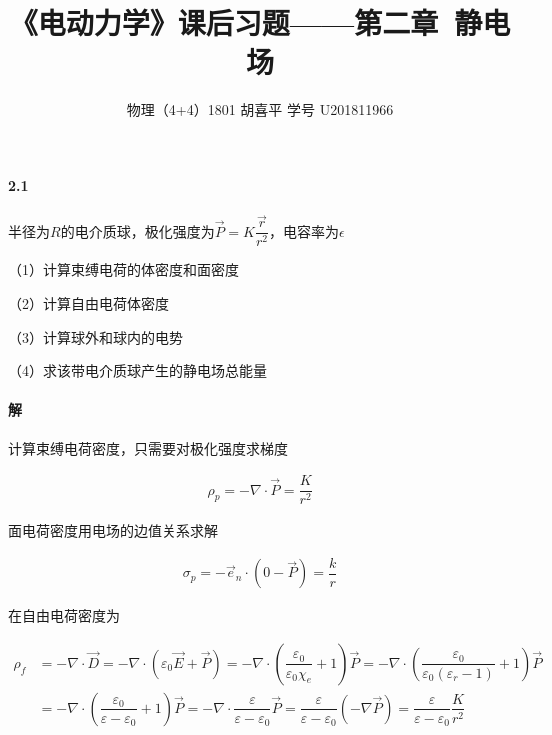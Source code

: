 \documentclass{article}
\author{物理（4+4）1801 \quad 胡喜平 \quad 学号 U201811966}
\affil{网站 https://hxp.plus/ \quad 邮件 hxp201406@gmail.com}
\title{《电动力学》课后习题——第二章\ 静电场}
\begin{document}
\maketitle\thispagestyle{fancy}

\paragraph{2.1}

半径为$R$的电介质球，极化强度为$\vec{P}=K \dfrac{\vec{r}}{r^2} $，电容率为$\epsilon$

（1）计算束缚电荷的体密度和面密度

（2）计算自由电荷体密度

（3）计算球外和球内的电势

（4）求该带电介质球产生的静电场总能量

\paragraph{解}

计算束缚电荷密度，只需要对极化强度求梯度

\begin{equation*}
  \begin{aligned}
    \rho_p = - \nabla \cdot \vec{P} = \dfrac{K}{r^2} 
  \end{aligned}
\end{equation*}

面电荷密度用电场的边值关系求解

\begin{equation*}
  \begin{aligned}
    \sigma_p = - \vec{e}_n \cdot \left( 0 - \vec{P} \right) = \dfrac{k}{r} 
  \end{aligned}
\end{equation*}

在自由电荷密度为

\begin{equation*}
  \begin{aligned}
    \rho_f &= - \nabla \cdot \vec{D} = - \nabla \cdot \left( \varepsilon_0 \vec{E} + \vec{P} \right)
    = - \nabla \cdot \left( \dfrac{\varepsilon_0}{\varepsilon_0 \chi_e} + 1   \right) \vec{P}
    = - \nabla \cdot \left( \dfrac{\varepsilon_0}{\varepsilon_0 \left( \varepsilon_r - 1 \right) } +1 \right) \vec{P} \\
    &= - \nabla \cdot \left( \dfrac{\varepsilon_0}{\varepsilon - \varepsilon_0} + 1 \right) \vec{P}
    = - \nabla \cdot \dfrac{\varepsilon}{\varepsilon - \varepsilon_0} \vec{P} = \dfrac{\varepsilon}{\varepsilon - \varepsilon_0} \left( - \nabla \vec{P} \right)
    = \dfrac{\varepsilon}{\varepsilon - \varepsilon_0} \dfrac{K}{r^2}
  \end{aligned}
\end{equation*}
\end{document}
